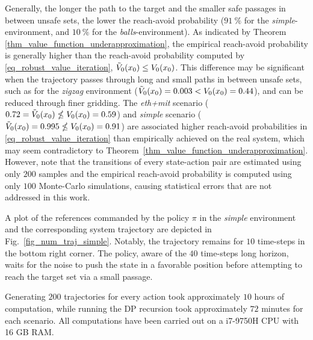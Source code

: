 \documentclass{IEEEtran}
\begin{document}
Generally, the longer the path to the target and the smaller safe passages in between unsafe sets, the lower the reach-avoid probability ($\SI{91}{\percent}$ for the \emph{simple}-environment, and $\SI{10}{\percent}$ for the \emph{balls}-environment). As indicated by Theorem \ref{thm_value_function_underapproximation}, the empirical reach-avoid probability is generally higher than the reach-avoid probability computed by \eqref{eq_robust_value_iteration}, $\Tilde{V}_0({x}_0)\leq V_0({x}_0)$. This difference may be significant when the trajectory passes through long and small paths in between unsafe sets, such as for the \emph{zigzag} environment ($\Tilde{V}_0({x}_0)=0.003<V_0({x}_0)=0.44$), and can be reduced through finer gridding. The \emph{eth+mit} scenario ($0.72=\Tilde{V}_0({x}_0)\nleq V_0({x}_0)=0.59$) and \emph{simple} scenario ($\Tilde{V}_0({x}_0)=0.995\nleq V_0({x}_0)=0.91$) are associated higher reach-avoid probabilities in \eqref{eq_robust_value_iteration} than empirically achieved on the real system, which may seem contradictory to Theorem~\ref{thm_value_function_underapproximation}. However, note that the transitions of every state-action pair are estimated using only $200$ samples and the empirical reach-avoid probability is computed using only $100$ Monte-Carlo simulations, causing statistical errors that are not addressed in this work. 

A plot of the references commanded by the policy $\pi$ in the \emph{simple} environment and the corresponding system trajectory are depicted in Fig.~\ref{fig_num_traj_simple}. Notably, the trajectory remains for $10$ time-steps in the bottom right corner. The policy, aware of the $40$ time-steps long horizon, waits for the noise to push the state in a favorable position before attempting to reach the target set via a small passage.

Generating $200$ trajectories for every action took approximately $10$ hours of computation, while running the DP recursion took approximately $72$ minutes for each scenario. All computations have been carried out on a i7-9750H CPU with 16 GB RAM.
\end{document}
